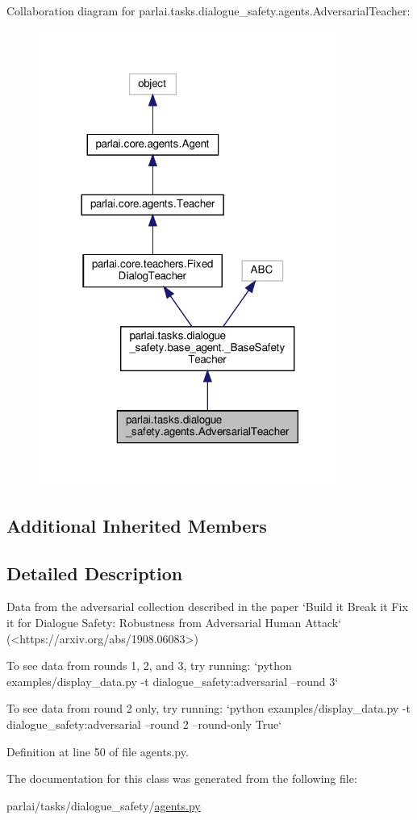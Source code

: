 Collaboration diagram for parlai.\+tasks.\+dialogue\+\_\+safety.\+agents.\+Adversarial\+Teacher\+:
\nopagebreak
\begin{figure}[H]
\begin{center}
\leavevmode
\includegraphics[width=281pt]{d8/d5c/classparlai_1_1tasks_1_1dialogue__safety_1_1agents_1_1AdversarialTeacher__coll__graph}
\end{center}
\end{figure}
\subsection*{Additional Inherited Members}


\subsection{Detailed Description}
\begin{DoxyVerb}Data from the adversarial collection described in the paper `Build it Break it Fix
it for Dialogue Safety: Robustness from Adversarial Human Attack`
(<https://arxiv.org/abs/1908.06083>)

To see data from rounds 1, 2, and 3, try running:
`python examples/display_data.py -t dialogue_safety:adversarial --round 3`

To see data from round 2 only, try running:
`python examples/display_data.py -t dialogue_safety:adversarial --round 2
 --round-only True`
\end{DoxyVerb}
 

Definition at line 50 of file agents.\+py.



The documentation for this class was generated from the following file\+:\begin{DoxyCompactItemize}
\item 
parlai/tasks/dialogue\+\_\+safety/\hyperlink{parlai_2tasks_2dialogue__safety_2agents_8py}{agents.\+py}\end{DoxyCompactItemize}
